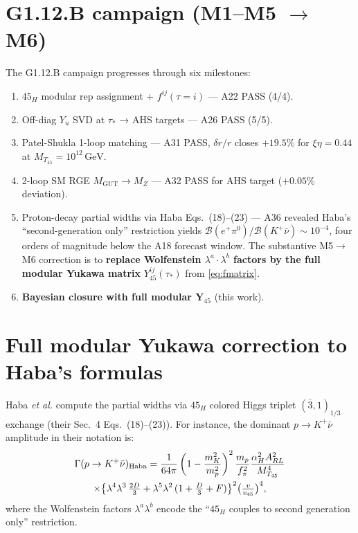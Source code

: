 \documentclass[reprint,prl,nofootinbib,floatfix,linenumbers]{revtex4-2}
\newcommand{\GeV}{\,\mathrm{GeV}}
\newcommand{\Gut}{\mathrm{GUT}}
\newcommand{\MGUT}{M_\Gut}
\newcommand{\MTfortyfive}{M_{T_{45}}}
\newcommand{\Br}[1]{\mathcal{B}(#1)}
\newcommand{\Yfortyfive}{\bm{Y}_{45}}
\newcommand{\taustar}{\tau_*}
\begin{document}
\section{G1.12.B campaign (M1--M5 $\to$ M6)}
\label{sec:campaign}

The G1.12.B campaign progresses through six milestones:
\begin{enumerate}[label=M\arabic*:,leftmargin=*]
\item $45_H$ modular rep assignment + $f^{ij}(\tau=i)$ — A22 PASS (4/4).
\item Off-diag $Y_u$ SVD at $\taustar$ → AHS targets — A26 PASS (5/5).
\item Patel-Shukla 1-loop matching — A31 PASS, $\delta r/r$ closes $+19.5\%$ for
$\xi\eta=0.44$ at $\MTfortyfive=10^{12}\GeV$.
\item 2-loop SM RGE $\MGUT\to M_Z$ — A32 PASS for AHS target ($+0.05\%$ deviation).
\item Proton-decay partial widths via Haba Eqs.~(18)--(23) — A36
revealed Haba's ``second-generation only'' restriction yields
$\Br{e^+\pi^0}/\Br{K^+\bar\nu}\sim 10^{-4}$, four orders of magnitude
below the A18 forecast window. The substantive M5$\to$M6 correction is
to {\bf replace Wolfenstein $\lambda^a\cdot\lambda^b$ factors by the
full modular Yukawa matrix} $Y_{45}^{ij}(\taustar)$ from \eqref{eq:fmatrix}.
\item {\bf Bayesian closure with full modular $\Yfortyfive$} (this work).
\end{enumerate}

\section{Full modular Yukawa correction to Haba's formulas}
\label{sec:modular}

Haba {\it et al.} \cite{Haba2024} compute the partial widths via
$45_H$ colored Higgs triplet $(\overline{3},1)_{1/3}$ exchange (their Sec.~4 Eqs.~(18)--(23)).
For instance, the dominant $p\to K^+\bar\nu$ amplitude in their notation is:
\begin{multline}
\Gamma(p\to K^+\bar\nu)_{\rm Haba} =
\frac{1}{64\pi}\left(1-\frac{m_K^2}{m_p^2}\right)^2
\frac{m_p}{f_\pi^2}
\frac{\alpha_H^2 A_{RL}^2}{\MTfortyfive^4}\\
\times\bigl\{\lambda^4\lambda^3\,\tfrac{2D}{3}
+\lambda^5\lambda^2\,(1+\tfrac{D}{3}+F)\bigr\}^2
\bigl(\tfrac{v}{v_{45}}\bigr)^4,
\end{multline}
where the Wolfenstein factors $\lambda^a\lambda^b$ encode the
``$45_H$ couples to second generation only'' restriction.
\end{document}
